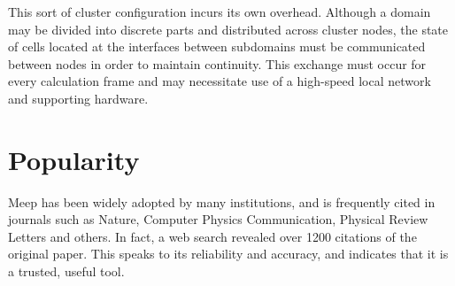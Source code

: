 This sort of cluster configuration incurs its own overhead. Although a domain may be divided into discrete parts and distributed across cluster nodes, the state of cells located at the interfaces between subdomains must be communicated between nodes in order to maintain continuity. This exchange must occur for every calculation frame and may necessitate use of a high-speed local network and supporting hardware. 

\section{Popularity}

Meep has been widely adopted by many institutions, and is frequently cited in journals such as Nature\cite{vynck2012photon}\cite{krogstrup2013single}, Computer Physics Communication\cite{liu2012s}, Physical Review Letters\cite{levin2010casimir} and others. In fact, a web search revealed over 1200 citations of the original\cite{OskooiRo10} paper. This speaks to its reliability and accuracy, and indicates that it is a trusted, useful tool.








